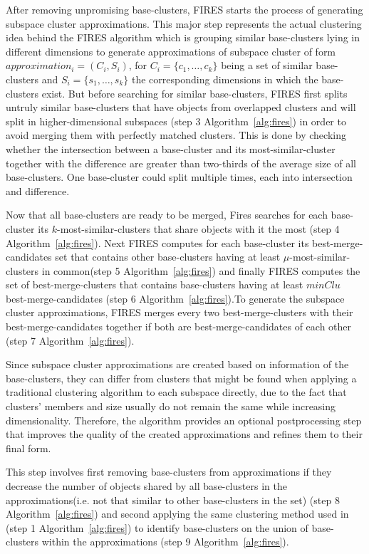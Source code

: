 After removing unpromising base-clusters, FIRES starts the process of generating subspace cluster approximations. This major step represents the actual clustering idea behind the FIRES algorithm which is grouping similar base-clusters lying in different dimensions to generate approximations of subspace cluster of form $approximation_{i} = (C_{i}, S_{i})$, for $C_{i} = \{c_{1},\ldots,c_{k}\}$ being a set of similar base-clusters and $S_{i} = \{s_{1},\ldots,s_{k}\}$ the corresponding dimensions in which the base-clusters exist. But before searching for similar base-clusters, FIRES first splits untruly similar base-clusters that have objects from overlapped clusters and will split in higher-dimensional subspaces (step 3 Algorithm~\ref{alg:fires}) in order to avoid merging them with perfectly matched clusters. This is done by checking whether the intersection between a base-cluster and its most-similar-cluster together with the difference are greater than two-thirds of the average size of all base-clusters. One base-cluster could split multiple times, each into intersection and difference.

Now that all base-clusters are ready to be merged, Fires searches for each base-cluster its $k$-most-similar-clusters that share objects with it the most (step 4 Algorithm~\ref{alg:fires}). Next FIRES computes for each base-cluster its best-merge-candidates set that contains other base-clusters having at least $\mu$-most-similar-clusters in common(step 5 Algorithm~\ref{alg:fires}) and finally FIRES computes the set of best-merge-clusters that contains base-clusters having at least $minClu$ best-merge-candidates (step 6 Algorithm~\ref{alg:fires}).To generate the subspace cluster approximations, FIRES merges every two best-merge-clusters with their best-merge-candidates together if both are best-merge-candidates of each other (step 7 Algorithm~\ref{alg:fires}).

Since subspace cluster approximations are created based on information of the base-clusters, they can differ from clusters that might be found when applying a traditional clustering algorithm to each subspace directly, due to the fact that clusters' members and size usually do not remain the same while increasing dimensionality. Therefore, the algorithm provides an optional postprocessing step that improves the quality of the created approximations and refines them to their final form.

This step involves first removing base-clusters from approximations if they decrease the number of objects shared by all base-clusters in the approximations(i.e. not that similar to other base-clusters in the set) (step 8 Algorithm~\ref{alg:fires}) and second applying the same clustering method used in (step 1 Algorithm~\ref{alg:fires}) to identify base-clusters on the union of base-clusters within the approximations (step 9 Algorithm~\ref{alg:fires}). 

